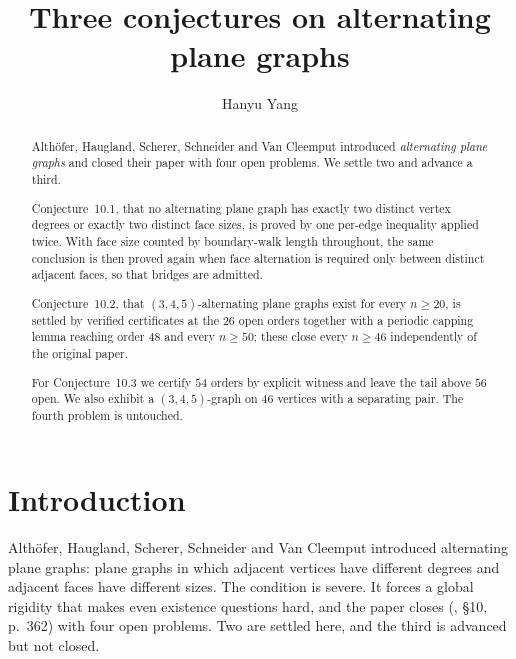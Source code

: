 \documentclass{baustms}
\theoremstyle{cupthm}
\theoremstyle{cupdefn}
\theoremstyle{cuprem}
\begin{document}
\title{Three conjectures on alternating plane graphs}
\author[1]{Hanyu Yang}
\address[1]{Independent researcher, California, USA}
\begin{abstract}
Alth\"ofer, Haugland, Scherer, Schneider and Van Cleemput introduced
\emph{alternating plane graphs} and closed their paper with four open problems.
We settle two and advance a third.

Conjecture~10.1, that no alternating plane graph has exactly two distinct vertex
degrees or exactly two distinct face sizes, is proved by one per-edge inequality
applied twice. With face size counted by boundary-walk length throughout, the
same conclusion is then proved again when face alternation is required only
between distinct adjacent faces, so that bridges are admitted.

Conjecture~10.2, that $(3,4,5)$-alternating plane graphs exist for every
$n \ge 20$, is settled by verified certificates at the $26$ open orders together
with a periodic capping lemma reaching order $48$ and every $n \ge 50$; these
close every $n \ge 46$ independently of the original paper.

For Conjecture~10.3 we certify $54$ orders by explicit witness and leave the
tail above $56$ open. We also exhibit a $(3,4,5)$-graph on $46$ vertices with a
separating pair. The fourth problem is untouched.
\end{abstract}
\maketitle

\section{Introduction}

Alth\"ofer, Haugland, Scherer, Schneider and Van Cleemput \cite{AHSSV2015}
introduced alternating plane graphs: plane graphs in which adjacent vertices
have different degrees and adjacent faces have different sizes. The condition is
severe. It forces a global rigidity that makes even existence questions hard,
and the paper closes (\cite{AHSSV2015}, \S10, p.~362) with four open problems.
Two are settled here, and the third is advanced but not closed.
\end{document}
